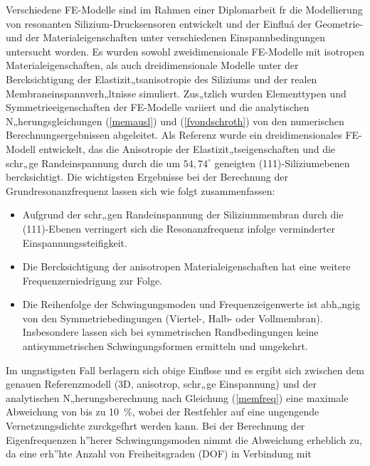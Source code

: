 Verschiedene FE-Modelle sind im Rahmen einer Diplomarbeit \cite{Sch92}
fr die Modellierung von resonanten Silizium-Drucksensoren entwickelt
und der Einfluá der Geometrie- und der Materialeigenschaften unter
verschiedenen Einspannbedingungen untersucht worden. Es wurden sowohl
zweidimensionale FE-Modelle mit isotropen Materialeigenschaften, als auch
dreidimensionale Modelle unter der Bercksichtigung der
Elastizit„tsanisotropie des Siliziums und der realen
Membraneinspannverh„ltnisse simuliert. Zus„tzlich wurden Elementtypen
und Symmetrieeigenschaften der FE-Modelle variiert und die analytischen
N„herungsgleichungen (\ref{memausl}) und (\ref{fvondschroth})
von den numerischen Berechnungsergebnissen abgeleitet. Als Referenz
wurde ein dreidimensionales FE-Modell entwickelt, das die Anisotropie
der Elastizit„tseigenschaften und die schr„ge Randeinspannung durch
die um $54,74^{\circ}$ geneigten (111)-Siliziumebenen
bercksichtigt. Die wichtigsten Ergebnisse bei der Berechnung der
Grundresonanzfrequenz lassen sich wie folgt zusammenfassen:
\begin{itemize}
\item
Aufgrund der schr„gen Randeinspannung der Siliziummembran durch die
(111)-Ebenen verringert sich die Resonanzfrequenz infolge verminderter
Einspannungssteifigkeit.
\item
Die Bercksichtigung der anisotropen Materialeigenschaften hat eine
weitere Frequenzerniedrigung %
zur Folge.
\item
Die Reihenfolge der Schwingungsmoden und Frequenzeigenwerte ist abh„ngig
von den Symmetriebedingungen (Viertel-, Halb- oder Vollmembran).
Insbesondere lassen sich bei symmetrischen Randbedingungen keine
antisymmetrischen Schwingungsformen ermitteln und umgekehrt.
\end{itemize}
Im ungnstigsten Fall berlagern sich obige Einflsse und es ergibt sich
zwischen dem genauen Referenzmodell (3D, anisotrop, schr„ge Einspannung)
und der analytischen N„herungsberechnung nach Gleichung (\ref{memfreq})
eine maximale Abweichung von bis zu 10~\%, wobei der Restfehler
auf eine ungengende Vernetzungsdichte zurckgefhrt werden kann. Bei der
Berechnung der Eigenfrequenzen h”herer Schwingungsmoden
nimmt die Abweichung erheblich zu,
da eine erh”hte Anzahl von Freiheitsgraden (DOF) in Verbindung mit
